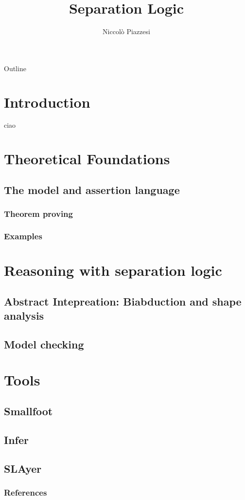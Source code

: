 \documentclass{beamer}
\title{Separation Logic}
\author{Niccolò Piazzesi}
\institute[UniPi]{
    Università degli studi di Pisa \\
    Anno Accademico 2021-22
}
\begin{document}
    \begin{frame}
        \maketitle
    \end{frame}
    \begin{frame}{Outline}
        \tableofcontents[hideallsubsections]
    \end{frame}
    \section{Introduction}

    \begin{frame}
        ciao \cite{o2001local}
    \end{frame}
    \section{Theoretical Foundations}
    \subsection{The model and assertion language}
    \subsubsection{Theorem proving}
    \subsubsection{Examples}
    \section{Reasoning with separation logic}
    \subsection{Abstract Intepreation: Biabduction and shape analysis}
    \subsection{Model checking}
    \section{Tools}
    \subsection{Smallfoot}
    \subsection{Infer}
    \subsection{SLAyer}
    \begin{frame}[allowframebreaks]
     
        \frametitle{References}
        
        
    \end{frame}
\end{document}
